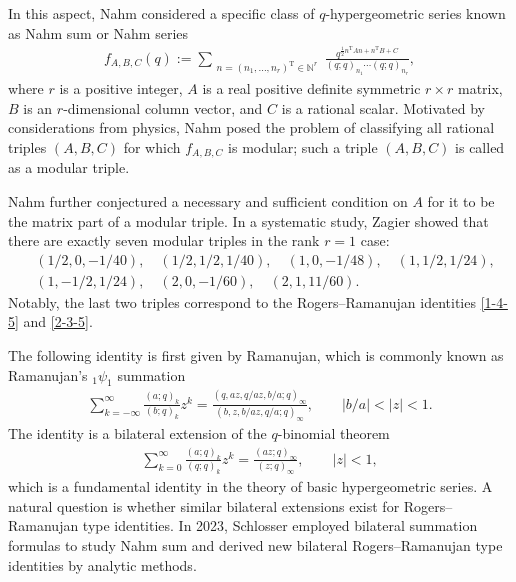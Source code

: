 \documentclass[pdftex]{sigma}
\numberwithin{equation}{section}
\theoremstyle{definition}
\begin{document}
In this aspect, Nahm \cite{Nahm-1994,Nahm-1995,Nahm-2007} considered a specific class of $q$-hypergeometric series known as Nahm sum or Nahm series
\begin{align*}
f_{A,B,C}(q) := \sum_{\substack{n=(n_1, \dots, n_r)^{\mathrm{T}} \in \mathbb{N}^r}} \frac{q^{\frac{1}{2} n^{\mathrm{T}} A n + n^{\mathrm{T}} B + C}}{(q; q)_{n_1} \cdots (q; q)_{n_r}},
\end{align*}
where $r$ is a positive integer, $A$ is a real positive definite symmetric $r\times r$ matrix, $B$ is an $r$\nobreakdash-di\-men\-sional column vector, and $C$ is a rational scalar. Motivated by considerations from physics, Nahm \cite{Nahm-2007} posed the problem of classifying all rational triples $(A, B, C)$ for which $f_{A,B,C}$ is modular; such a triple $(A,B,C)$ is called as a modular triple.\par
Nahm further conjectured a necessary and sufficient condition on $A$ for it to be the matrix part of a modular triple. In a systematic study, Zagier \cite{Zagier-2007} showed that there are exactly seven modular triples in the rank $r=1$ case:
\begin{align*}
& (1/2,0,-1/40), \quad (1/2,1/2,1/40), \quad (1,0,-1/48), \quad (1,1/2,1/24),\\
& (1,-1/2,1/24),  \quad (2,0,-1/60), \quad (2,1,11/60).
\end{align*}
Notably, the last two triples correspond to the Rogers--Ramanujan identities \eqref{1-4-5} and \eqref{2-3-5}.\par
The following identity is first given by Ramanujan, which is commonly known as Ramanujan's $_1\psi_1$ summation \cite[Appendix~II.29]{red}
\begin{align}\label{1psi1}
 \sum_{k=-\infty}^{\infty} \frac{(a; q)_k}{(b; q)_k} z^k = \frac{(q, az, q/az, b/a; q)_{\infty}}{(b, z, b/az, q/a; q)_{\infty}}, \qquad |b/a| < |z| < 1.
\end{align}
The identity is a bilateral extension of the $q$-binomial theorem \cite[Appendix~II.3]{red}
\begin{align*}
 \sum_{k=0}^{\infty} \frac{(a; q)_k}{(q; q)_k} z^k = \frac{(az; q)_{\infty}}{(z; q)_{\infty}}, \qquad |z| < 1,
\end{align*}
which is a fundamental identity in the theory of basic hypergeometric series. A natural question is whether similar bilateral extensions exist for Rogers--Ramanujan type identities. In 2023, Schlosser \cite{Schlosser-2023} employed bilateral summation formulas to study Nahm sum and derived new bilateral Rogers--Ramanujan type identities by analytic methods.\par
\end{document}
